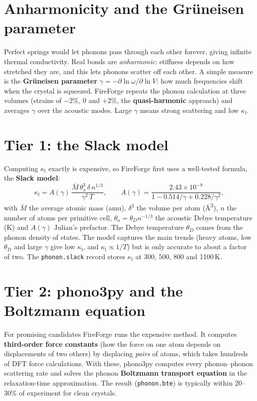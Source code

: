 \documentclass[11pt,a4paper]{report}
\newcommand{\code}[1]{\texttt{#1}}
\newcommand{\kl}{\kappa_\mathrm{l}}
\begin{document}
\section{Anharmonicity and the Grüneisen parameter}

Perfect springs would let phonons pass through each other forever, giving infinite thermal
conductivity. Real bonds are \emph{anharmonic}: stiffness depends on how stretched they are,
and this lets phonons scatter off each other. A simple measure is the \textbf{Grüneisen
parameter} $\gamma=-\partial\ln\omega/\partial\ln V$: how much frequencies shift when the crystal
is squeezed. FireForge repeats the phonon calculation at three volumes (strains of $-2\%$, $0$ and
$+2\%$, the \textbf{quasi-harmonic} approach) and averages $\gamma$ over the acoustic modes. Large
$\gamma$ means strong scattering and low $\kl$.

\section{Tier 1: the Slack model}

Computing $\kl$ exactly is expensive, so FireForge first uses a well-tested formula, the
\textbf{Slack model}:
\begin{equation}
  \kl = A(\gamma)\,\frac{\bar M\,\theta_a^3\,\delta\,n^{1/3}}{\gamma^2\,T},
  \qquad A(\gamma)=\frac{2.43\times10^{-8}}{1-0.514/\gamma+0.228/\gamma^2},
\end{equation}
with $\bar M$ the average atomic mass (amu), $\delta^3$ the volume per atom
(\si{\angstrom\cubed}), $n$ the number of atoms per primitive cell, $\theta_a=\theta_D n^{-1/3}$ the
acoustic Debye temperature (K) and $A(\gamma)$ Julian's prefactor. The Debye temperature
$\theta_D$ comes from the phonon density of states. The model captures the main trends
(heavy atoms, low $\theta_D$ and large $\gamma$ give low $\kl$, and $\kl\propto1/T$) but is only
accurate to about a factor of two. The \code{phonon.slack} record stores $\kl$ at 300, 500, 800
and 1100\,K.

\section{Tier 2: phono3py and the Boltzmann equation}

For promising candidates FireForge runs the expensive method. It computes
\textbf{third-order force constants} (how the force on one atom depends on displacements of two
others) by displacing \emph{pairs} of atoms, which takes hundreds of DFT force calculations. With
these, phono3py computes every phonon--phonon scattering rate and solves the phonon
\textbf{Boltzmann transport equation} in the relaxation-time approximation. The result
(\code{phonon.bte}) is typically within 20--30\% of experiment for clean crystals.
\end{document}
